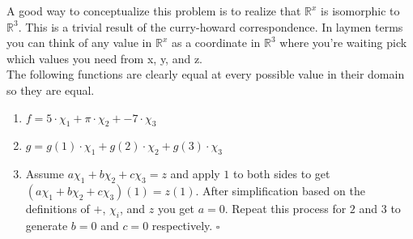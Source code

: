 \documentclass{article}
\newcommand{\qed}{\hfill\ensuremath{\square}}
\begin{document}
A good way to conceptualize this problem is to realize that $\mathbb{R}^x$ is
isomorphic to $\mathbb{R}^3$. This is a trivial result of the curry-howard
correspondence. In laymen terms you can think of any value in $\mathbb{R}^x$ as
a coordinate in $\mathbb{R}^3$ where you're waiting pick which values you need
from x, y, and z. \\
The following functions are clearly equal at every possible value in their
domain so they are equal.
\begin{enumerate}[label=(\alph*),leftmargin=*]
  \item $f = 5 \cdot \chi_1 + \pi \cdot \chi_2 + -7 \cdot \chi_3$ 
  \item $g = g(1) \cdot \chi_1 + g(2) \cdot \chi_2 + g(3) \cdot \chi_3$
  \item Assume $a\chi_1 + b\chi_2 + c\chi_3 = z$ and apply $1$ to both sides to get
        $(a\chi_1 + b\chi_2 + c\chi_3)(1) = z(1)$. After simplification based on the
        definitions of $+$, $\chi_i$, and $z$ you get $a = 0$. Repeat this process for $2$ and $3$
        to generate $b = 0$ and $c = 0$ respectively. \qed
\end{enumerate}
\end{document}
